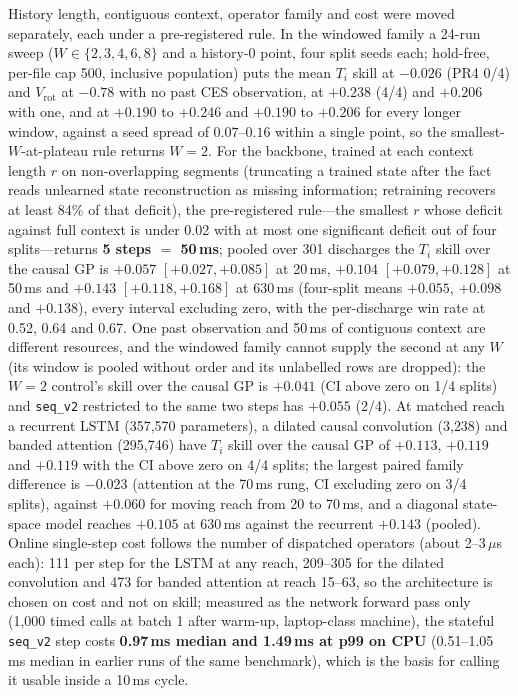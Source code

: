 \documentclass[10pt]{article}
\newcommand{\Ti}{\ensuremath{T_i}}
\newcommand{\Vrot}{\ensuremath{V_\mathrm{rot}}}
\newcommand{\seqv}{\texttt{seq\_v2}}
\begin{document}
History length, contiguous context, operator family and cost were moved separately,
each under a pre-registered rule. In the windowed family a 24-run sweep
($W \in \{2,3,4,6,8\}$ and a history-0 point, four split seeds each; hold-free,
per-file cap 500, inclusive population) puts the mean \Ti{} skill at $-0.026$ (PR4
0/4) and \Vrot{} at $-0.78$ with no past CES observation, at $+0.238$ (4/4) and
$+0.206$ with one, and at $+0.190$ to $+0.246$ and $+0.190$ to $+0.206$ for every
longer window, against a seed spread of $0.07$--$0.16$ within a single point, so the
smallest-$W$-at-plateau rule returns $W = 2$. For the backbone, trained at each
context length $r$ on non-overlapping segments (truncating a trained state after the
fact reads unlearned state reconstruction as missing information; retraining recovers
at least 84\% of that deficit), the pre-registered rule---the smallest $r$ whose
deficit against full context is under 0.02 with at most one significant deficit out
of four splits---returns \textbf{5 steps $=$ 50\,ms}; pooled over 301 discharges the
\Ti{} skill over the causal GP is $+0.057$ $[+0.027, +0.085]$ at 20\,ms, $+0.104$
$[+0.079, +0.128]$ at 50\,ms and $+0.143$ $[+0.118, +0.168]$ at 630\,ms (four-split
means $+0.055$, $+0.098$ and $+0.138$), every interval excluding zero, with the
per-discharge win rate at 0.52, 0.64 and 0.67. One past observation and 50\,ms of
contiguous context are different resources, and the windowed family cannot supply the
second at any $W$ (its window is pooled without order and its unlabelled rows are
dropped): the $W{=}2$ control's skill over the causal GP is $+0.041$ (CI above zero
on 1/4 splits) and \seqv{} restricted to the same two steps has $+0.055$ (2/4). At
matched reach a recurrent LSTM (357{,}570 parameters), a dilated causal convolution
(3{,}238) and banded attention (295{,}746) have \Ti{} skill over the causal GP of
$+0.113$, $+0.119$ and $+0.119$ with the CI above zero on 4/4 splits; the largest
paired family difference is $-0.023$ (attention at the 70\,ms rung, CI excluding zero
on 3/4 splits), against $+0.060$ for moving reach from 20 to 70\,ms, and a diagonal
state-space model reaches $+0.105$ at 630\,ms against the recurrent $+0.143$ (pooled).
Online single-step cost follows the number of dispatched operators (about
2--3\,$\mu$s each): 111 per step for the LSTM at any reach, 209--305 for the dilated
convolution and 473 for banded attention at reach 15--63, so the architecture is
chosen on cost and not on skill; measured as the network forward pass only (1{,}000
timed calls at batch 1 after warm-up, laptop-class machine), the stateful \seqv{}
step costs \textbf{0.97\,ms median and 1.49\,ms at p99 on CPU} (0.51--1.05\,ms median
in earlier runs of the same benchmark), which is the basis for calling it usable
inside a 10\,ms cycle.
\end{document}
